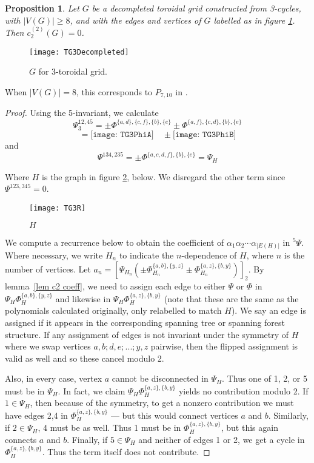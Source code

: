 \documentclass[12pt]{amsart}
\newtheorem{proposition}[definition]{Proposition}
\numberwithin{definition}{section}
\begin{document}
\begin{proposition}\label{prop 3tor}
	Let $G$ be a decompleted toroidal grid constructed from 3-cycles, with $|V(G)|\geq8$, and with the edges and vertices of $G$ labelled as in figure \ref{fig G 3}. Then $c_2^{(2)}(G)=0$.
\end{proposition}
\begin{figure}[h]
	\texttt{[image: TG3Decompleted]}
	\caption{$G$ for 3-toroidal grid.}\label{fig G 3}
\end{figure}
When $|V(G)|=8$, this corresponds to $P_{7,10}$ in \cite{Schnetz2010}. \\ 
\begin{proof}
	Using the 5-invariant, we calculate 
	\[\Psi_3^{12,45}=\pm \Phi^{\{a,d\},\{c,f\},\{b\},\{e\}} \pm \Phi^{\{a,f\},\{c,d\},\{b\},\{e\}}\]
	\[=\texttt{[image: TG3PhiA]} \quad \pm \texttt{[image: TG3PhiB]}\]
	and
	\[\Psi^{134,235}=   \pm \Phi^{\{a,c,d,f\},\{b\},\{e\}}=\Psi_H\]
	
	\noindent Where $H$ is the graph in figure \ref{fig H 3}, below. We disregard the other term since $\Psi^{123,345}=0$.  \\
	\begin{figure}[h]
		\texttt{[image: TG3R]} 
		\caption{$H$}\label{fig H 3}
	\end{figure}
	We compute a recurrence below to obtain the coefficient of $\alpha_1\alpha_2\cdots \alpha_{|E(H)|}$ in ${}^5\Psi$. Where necessary, we write $H_n$ to indicate the $n$-dependence of $H$, where $n$ is the number of vertices. Let $a_n=[\Psi_{H_n}(\pm \Phi_{H_n}^{\{a,b\},\{y,z\}} \pm \Phi_{H_n}^{\{a,z\},\{b,y\}})]_2$. By lemma~\ref{lem c2 coeff}, we need to assign each edge to either $\Psi$ or $\Phi$ in  $\Psi_H\Phi_H^{\{a,b\},\{y,z\}}$ and likewise in $\Psi_H\Phi_H^{\{a,z\},\{b,y\}}$ (note that these are the same as the polynomials calculated originally, only relabelled to match $H$). We say an edge is assigned if it appears in the corresponding spanning tree or spanning forest structure. If any assignment of edges is not invariant under the symmetry of $H$ where we swap vertices $a,b;d,e;...;y,z$ pairwise, then the flipped assignment is valid as well and so these cancel modulo 2.
        
	Also, in every case, vertex $a$ cannot be disconnected in $\Psi_H$. Thus one of 1, 2, or 5 must be in $\Psi_H$. In fact, we claim $\Psi_H\Phi_H^{\{a,z\},\{b,y\}}$ yields no contribution modulo 2. If $1\in \Psi_H$, then because of the symmetry, to get a nonzero contribution we must have edges 2,4 in $\Phi_H^{\{a,z\},\{b,y\}}$ --- but this would connect vertices $a$ and $b$. Similarly, if $2\in \Psi_H$, 4 must be as well. Thus 1 must be in $\Phi_H^{\{a,z\},\{b,y\}}$, but this again connects $a$ and $b$. Finally, if $5\in \Psi_H$ and neither of edges 1 or 2, we get a cycle in $\Phi_H^{\{a,z\},\{b,y\}}$. Thus the term itself does not contribute.
        

\end{proof}
\end{document}

